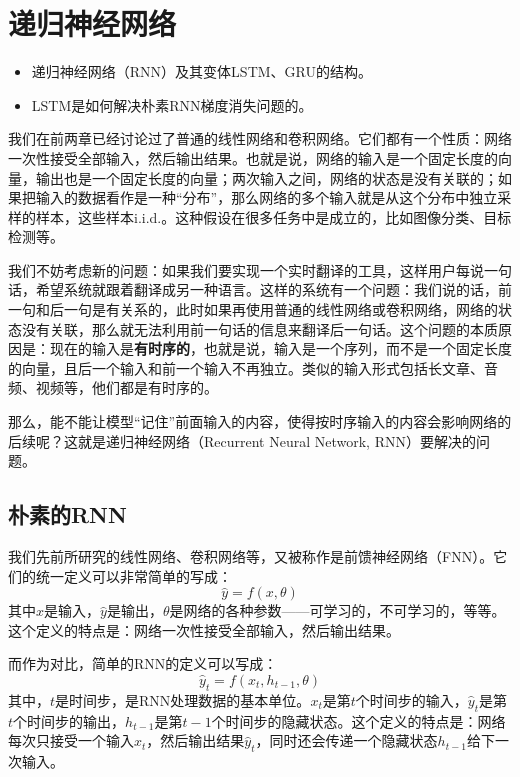 \chapter{递归神经网络}

\begin{intro}
\begin{itemize}
    \item 递归神经网络（RNN）及其变体LSTM、GRU的结构。
    \item LSTM是如何解决朴素RNN梯度消失问题的。
\end{itemize}
\end{intro}

我们在前两章已经讨论过了普通的线性网络和卷积网络。它们都有一个性质：网络一次性接受全部输入，然后输出结果。也就是说，网络的输入是一个固定长度的向量，输出也是一个固定长度的向量；两次输入之间，网络的状态是没有关联的；如果把输入的数据看作是一种“分布”，那么网络的多个输入就是从这个分布中独立采样的样本，这些样本i.i.d.。这种假设在很多任务中是成立的，比如图像分类、目标检测等。

我们不妨考虑新的问题：如果我们要实现一个实时翻译的工具，这样用户每说一句话，希望系统就跟着翻译成另一种语言。这样的系统有一个问题：我们说的话，前一句和后一句是有关系的，此时如果再使用普通的线性网络或卷积网络，网络的状态没有关联，那么就无法利用前一句话的信息来翻译后一句话。这个问题的本质原因是：现在的输入是\textbf{有时序的}，也就是说，输入是一个序列，而不是一个固定长度的向量，且后一个输入和前一个输入不再独立。类似的输入形式包括长文章、音频、视频等，他们都是有时序的。

那么，能不能让模型“记住”前面输入的内容，使得按时序输入的内容会影响网络的后续呢？这就是递归神经网络（Recurrent Neural Network, RNN）要解决的问题。

\section{朴素的RNN}

我们先前所研究的线性网络、卷积网络等，又被称作是前馈神经网络（FNN）。它们的统一定义可以非常简单的写成：
\begin{equation}
    \hat{y} = f(x, \theta)
\end{equation}
其中$x$是输入，$\hat{y}$是输出，$\theta$是网络的各种参数——可学习的，不可学习的，等等。这个定义的特点是：网络一次性接受全部输入，然后输出结果。

而作为对比，简单的RNN的定义可以写成：
\begin{equation}
    \hat{y}_t = f(x_t, h_{t-1}, \theta)
\end{equation}
其中，$t$是时间步，是RNN处理数据的基本单位。$x_t$是第$t$个时间步的输入，$\hat{y}_t$是第$t$个时间步的输出，$h_{t-1}$是第$t-1$个时间步的隐藏状态。这个定义的特点是：网络每次只接受一个输入$x_t$，然后输出结果$\hat{y}_t$，同时还会传递一个隐藏状态$h_{t-1}$给下一次输入。

